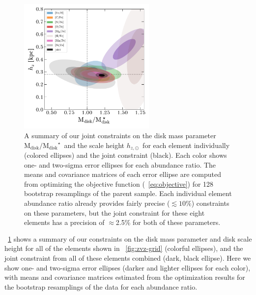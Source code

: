 \documentclass[modern]{aastex63}
\newcommand{\mdisk}{\ensuremath{\mathrm{M}_\mathrm{disk}}}
\newcommand{\mratio}{\ensuremath{\mdisk / \mdisk^\star}}
\newcommand{\hz}{\ensuremath{h_{z, \odot}}}
\begin{document}
\begin{figure}[!tp]
  \begin{mdframed}
    \color{captiongray}
  \begin{center}
  \includegraphics[width=0.6\textwidth]{M-hz-error-ellipses.pdf}
  \end{center}
  \caption{%
    A summary of our joint constraints on the disk mass parameter \mratio\ and
    the scale height \hz\ for each element individually (colored ellipses) and
    the joint constraint (black).
    Each color shows one- and two-sigma error ellipses for each abundance ratio.
    The means and covariance matrices of each error ellipse are computed from
    optimizing the objective function (\equationname~\ref{eq:objective}) for 128
    bootstrap resamplings of the parent sample.
    Each individual element abundance ratio already provides fairly precise
    ($\lesssim10\%$) constraints on these parameters, but the joint constraint
    for these eight elements has a precision of $\approx$2.5\% for both of these
    parameters.
  \label{fig:elem-ellipses-1}
  }
  \end{mdframed}
\end{figure}

\figurename~\ref{fig:elem-ellipses-1} shows a summary of our constraints on the
disk mass parameter and disk scale height for all of the elements shown in
\figurename~\ref{fig:zvz-grid} (colorful ellipses), and the joint constraint
from all of these elements combined (dark, black ellipse).
Here we show one- and two-sigma error ellipses (darker and lighter ellipses for
each color), with means and covariance matrices estimated from the optimization
results for the bootstrap resamplings of the data for each abundance ratio.
\end{document}
